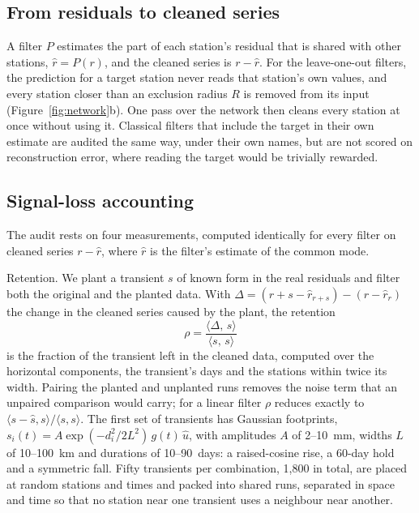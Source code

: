 \documentclass[11pt,a4paper]{article}
\begin{document}
\subsection{From residuals to cleaned series}

A filter $P$ estimates the part of each station's residual that is shared with other stations, $\hat r = P(r)$, and the cleaned series is $r - \hat r$. For the leave-one-out filters, the prediction for a target station never reads that station's own values, and every station closer than an exclusion radius $R$ is removed from its input (Figure~\ref{fig:network}b). One pass over the network then cleans every station at once without using it. Classical filters that include the target in their own estimate are audited the same way, under their own names, but are not scored on reconstruction error, where reading the target would be trivially rewarded.

\subsection{Signal-loss accounting}
\label{sec:accounting}

The audit rests on four measurements, computed identically for every filter on cleaned series $r - \hat{r}$, where $\hat{r}$ is the filter's estimate of the common mode.

Retention. We plant a transient $s$ of known form in the real residuals and filter both the original and the planted data. With $\Delta = (r + s - \hat{r}_{r+s}) - (r - \hat{r}_{r})$ the change in the cleaned series caused by the plant, the retention
\begin{equation}
\rho = \frac{\langle \Delta,\, s \rangle}{\langle s,\, s \rangle}
\label{eq:retention}
\end{equation}
is the fraction of the transient left in the cleaned data, computed over the horizontal components, the transient's days and the stations within twice its width. Pairing the planted and unplanted runs removes the noise term that an unpaired comparison would carry; for a linear filter $\rho$ reduces exactly to $\langle s - \hat{s}, s \rangle / \langle s, s \rangle$. The first set of transients has Gaussian footprints, $s_i(t) = A \exp(-d_i^2 / 2L^2)\, g(t)\, \hat{u}$, with amplitudes $A$ of 2--10~mm, widths $L$ of 10--100~km and durations of 10--90~days: a raised-cosine rise, a 60-day hold and a symmetric fall. Fifty transients per combination, 1,800 in total, are placed at random stations and times and packed into shared runs, separated in space and time so that no station near one transient uses a neighbour near another.
\end{document}
